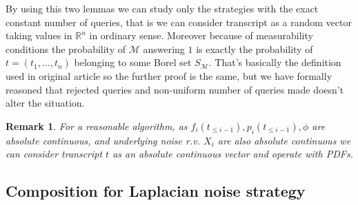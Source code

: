 \documentclass[12pt,letterpaper]{article}
\newcommand{\R}{\mathbb{R}}
\newtheorem{remark}{Remark}
\begin{document}
By using this two lemmas we can study only the strategies with the exact constant number of queries, that is we can consider transcript as a random vector taking values in $\R^n$ in ordinary sense. Moreover because of measurability conditions the probability of $\mathcal{M}$ answering $1$ is exactly the probability of $t = (t_1, \ldots, t_n)$ belonging to some Borel set $S_{\mathcal{M}}$. That's basically the definition used in original article so the further proof is the same, but we have formally reasoned that rejected queries and non-uniform number of queries made doesn't alter the situation.

\begin{remark}
For a reasonable algorithm, as $f_i(t_{\leq i - 1}), p_i(t_{\leq i - 1}), \phi$ are absolute continuous, and underlying noise r.v. $X_i$ are also absolute continuous we can consider transcript $t$ as an absolute continuous vector and operate with PDFs.
\end{remark}

\subsection{Composition for Laplacian noise strategy}
\end{document}
